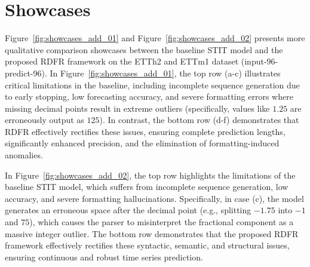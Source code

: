 \section{Showcases}\label{appx:showcase_addition}

Figure~\ref{fig:showcases_add_01} and Figure~\ref{fig:showcases_add_02} presents more qualitative comparison showcases between the baseline STIT model and the proposed RDFR framework on the ETTh2 and ETTm1 dataset (input-96-predict-96).
In Figure~\ref{fig:showcases_add_01}, the top row (a-c) illustrates critical limitations in the baseline, including incomplete sequence generation due to early stopping, low forecasting accuracy, and severe formatting errors where missing decimal points result in extreme outliers (specifically, values like $1.25$ are erroneously output as $125$). In contrast, the bottom row (d-f) demonstrates that RDFR effectively rectifies these issues, ensuring complete prediction lengths, significantly enhanced precision, and the elimination of formatting-induced anomalies.

In Figure~\ref{fig:showcases_add_02}, the top row highlights the limitations of the baseline STIT model, which suffers from incomplete sequence generation, low accuracy, and severe formatting hallucinations. Specifically, in case (c), the model generates an erroneous space after the decimal point (e.g., splitting $-1.75$ into $-1$ and $75$), which causes the parser to misinterpret the fractional component as a massive integer outlier. The bottom row demonstrates that the proposed RDFR framework effectively rectifies these syntactic, semantic, and structural issues, ensuring continuous and robust time series prediction.




